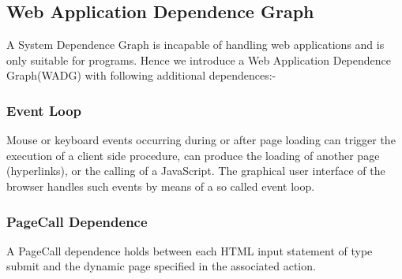 \documentclass[11pt]{article}   %
\begin{document}
\subsection{Web Application Dependence Graph}
A System Dependence Graph is incapable of handling web applications and is only suitable for programs. Hence we introduce a Web Application Dependence Graph(WADG) with following additional dependences:-
\subsubsection{Event Loop}
Mouse or keyboard events occurring during or after page loading can trigger the execution of a client side procedure, can produce the loading of another page (hyperlinks), or the calling of a JavaScript. The graphical user interface of the browser handles such events by means of a so called event loop.
\subsubsection{PageCall Dependence}
A PageCall dependence holds between each HTML input statement of type submit and the dynamic page specified in the associated action.
\end{document}
